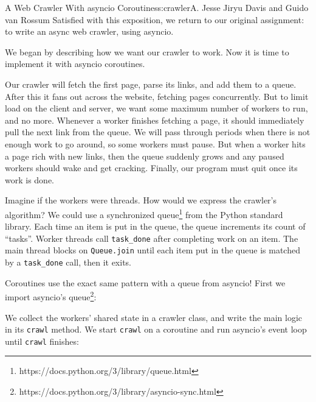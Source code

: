 \begin{aosachapter}{A Web Crawler With asyncio Coroutines}{s:crawler}{A. Jesse Jiryu Davis and Guido van Rossum}
Satisfied with this exposition, we return to our original assignment: to
write an async web crawler, using asyncio.

\label{coordinating-coroutines}

We began by describing how we want our crawler to work. Now it is time
to implement it with asyncio coroutines.

Our crawler will fetch the first page, parse its links, and add them to
a queue. After this it fans out across the website, fetching pages
concurrently. But to limit load on the client and server, we want some
maximum number of workers to run, and no more. Whenever a worker
finishes fetching a page, it should immediately pull the next link from
the queue. We will pass through periods when there is not enough work to
go around, so some workers must pause. But when a worker hits a page
rich with new links, then the queue suddenly grows and any paused
workers should wake and get cracking. Finally, our program must quit
once its work is done.

Imagine if the workers were threads. How would we express the crawler's
algorithm? We could use a synchronized queue\footnote{https://docs.python.org/3/library/queue.html}
from the Python standard library. Each time an item is put in the queue,
the queue increments its count of ``tasks''. Worker threads call
\texttt{task\_done} after completing work on an item. The main thread
blocks on \texttt{Queue.join} until each item put in the queue is
matched by a \texttt{task\_done} call, then it exits.

Coroutines use the exact same pattern with a queue from asyncio! First
we import asyncio's queue\footnote{https://docs.python.org/3/library/asyncio-sync.html}:

\begin{Shaded}
\begin{Highlighting}[]
\NormalTok{:}
       
 \NormalTok{:}
      
\end{Highlighting}
\end{Shaded}

We collect the workers' shared state in a crawler class, and write the
main logic in its \texttt{crawl} method. We start \texttt{crawl} on a
coroutine and run asyncio's event loop until \texttt{crawl} finishes:


\end{aosachapter}
